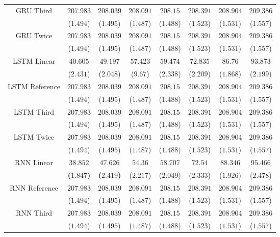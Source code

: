 \begin{table}[!ht]
{\begin{tabular}{|c|c|c|c|c|c|c|c|}
			\multirow{2}{*}{GRU Third} & $207.983$ & $208.039$ & $208.091$ & $208.15$ & $208.391$ & $208.904$ & $209.386$ \\
			 & ($1.494$) & ($1.495$) & ($1.487$) & ($1.488$) & ($1.523$) & ($1.531$) & ($1.557$) \\ \hline
			\multirow{2}{*}{GRU Twice} & $207.983$ & $208.039$ & $208.091$ & $208.15$ & $208.391$ & $208.904$ & $209.386$ \\
			 & ($1.494$) & ($1.495$) & ($1.487$) & ($1.488$) & ($1.523$) & ($1.531$) & ($1.557$) \\ \hline
			\multirow{2}{*}{LSTM Linear} & $40.605$ & $49.197$ & $57.423$ & $59.474$ & $72.835$ & $86.76$ & $93.873$ \\
			 & ($2.431$) & ($2.048$) & ($9.67$) & ($2.338$) & ($2.209$) & ($1.868$) & ($2.199$) \\ \hline
			\multirow{2}{*}{LSTM Reference} & $207.983$ & $208.039$ & $208.091$ & $208.15$ & $208.391$ & $208.904$ & $209.386$ \\
			 & ($1.494$) & ($1.495$) & ($1.487$) & ($1.488$) & ($1.523$) & ($1.531$) & ($1.557$) \\ \hline
			\multirow{2}{*}{LSTM Third} & $207.983$ & $208.039$ & $208.091$ & $208.15$ & $208.391$ & $208.904$ & $209.386$ \\
			 & ($1.494$) & ($1.495$) & ($1.487$) & ($1.488$) & ($1.523$) & ($1.531$) & ($1.557$) \\ \hline
			\multirow{2}{*}{LSTM Twice} & $207.983$ & $208.039$ & $208.091$ & $208.15$ & $208.391$ & $208.904$ & $209.386$ \\
			 & ($1.494$) & ($1.495$) & ($1.487$) & ($1.488$) & ($1.523$) & ($1.531$) & ($1.557$) \\ \hline
			\multirow{2}{*}{RNN Linear} & $\mathbf{38.852}$ & $\mathbf{47.626}$ & $54.36$ & $58.707$ & $72.54$ & $88.346$ & $95.466$ \\
			 & \textbf{(}$\mathbf{1.847}$\textbf{)} & \textbf{(}$\mathbf{2.419}$\textbf{)} & ($2.217$) & ($2.049$) & ($2.333$) & ($1.926$) & ($2.478$) \\ \hline
			\multirow{2}{*}{RNN Reference} & $207.983$ & $208.039$ & $208.091$ & $208.15$ & $208.391$ & $208.904$ & $209.386$ \\
			 & ($1.494$) & ($1.495$) & ($1.487$) & ($1.488$) & ($1.523$) & ($1.531$) & ($1.557$) \\ \hline
			\multirow{2}{*}{RNN Third} & $207.983$ & $208.039$ & $208.091$ & $208.15$ & $208.391$ & $208.904$ & $209.386$ \\
			 & ($1.494$) & ($1.495$) & ($1.487$) & ($1.488$) & ($1.523$) & ($1.531$) & ($1.557$) \\ \hline

\end{tabular}}
\end{table}
